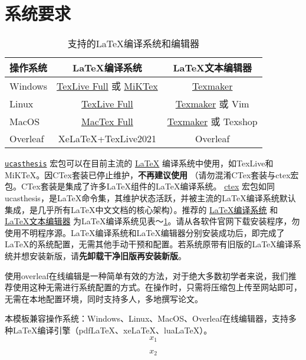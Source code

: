 \section{系统要求}\label{sec:system}
\begin{table}
    \caption{支持的LaTeX编译系统和编辑器}%
    \footnotesize%
    \setlength{\tabcolsep}{4pt}%
    \renewcommand{\arraystretch}{1.5}%
    \centering
    \begin{tabular}{lcc}
        \hline
        操作系统 & LaTeX编译系统 & LaTeX文本编辑器\\
        \hline
        Windows & \href{https://www.tug.org/texlive/acquire-netinstall.html}{TexLive Full} 或 \href{https://miktex.org/download}{MiKTex} & \href{http://www.xm1math.net/texmaker/}{Texmaker}\\
        Linux & \href{https://www.tug.org/texlive/acquire-netinstall.html}{TexLive Full} & \href{http://www.xm1math.net/texmaker/}{Texmaker} 或 Vim\\
        MacOS & \href{https://www.tug.org/mactex/}{MacTex Full} & \href{http://www.xm1math.net/texmaker/}{Texmaker} 或 Texshop\\
        Overleaf & XeLaTeX+TexLive2021 & Overleaf \\
        \hline
    \end{tabular}
    \label{tab:compiler}
\end{table}
\href{https://github.com/mohuangrui/ucasthesis}{\texttt{ucasthesis}} 宏包可以在目前主流的 \href{https://en.wikibooks.org/wiki/LaTeX/Introduction}{LaTeX} 编译系统中使用，如TexLive和MiKTeX。因CTex套装已停止维护，\textbf{不再建议使用} （请勿混淆CTex套装与ctex宏包。CTex套装是集成了许多LaTeX组件的LaTeX编译系统。 \href{https://ctan.org/pkg/ctex?lang=en}{ctex} 宏包如同ucasthesis，是LaTeX命令集，其维护状态活跃，并被主流的LaTeX编译系统默认集成，是几乎所有LaTeX中文文档的核心架构）。推荐的 \href{https://en.wikibooks.org/wiki/LaTeX/Installation}{LaTeX编译系统} 和 \href{https://en.wikibooks.org/wiki/LaTeX/Installation}{LaTeX文本编辑器} 为LaTeX编译系统见表～\ref{tab:compiler}。请从各软件官网下载安装程序，勿使用不明程序源。LaTeX编译系统和LaTeX编辑器分别安装成功后，即完成了LaTeX的系统配置，无需其他手动干预和配置。若系统原带有旧版的LaTeX编译系统并想安装新版，请\textbf{先卸载干净旧版再安装新版}。

使用overleaf在线编辑是一种简单有效的方法，对于绝大多数初学者来说，我们推荐使用这种无需进行系统配置的方式。在操作时，只需将压缩包上传至网站即可，无需在本地配置环境，同时支持多人，多地撰写论文。

本模板兼容操作系统：Windows、Linux、MacOS、Overleaf在线编辑器，支持多种LaTeX编译引擎（pdfLaTeX、xeLaTeX、luaLaTeX）。
\begin{equation}
    x_1
\end{equation}

\begin{equation}
    x_2
\end{equation}